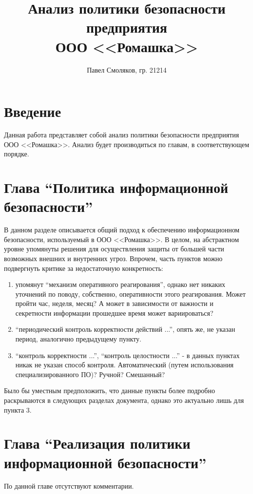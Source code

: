 \documentclass{article}
\title{Анализ политики безопасности предприятия\\ООО <<Ромашка>>}
\author{Павел Смоляков, гр. 21214}
\begin{document}
\maketitle

\section{Введение}
Данная работа представляет собой анализ политики безопасности предприятия ООО <<Ромашка>>. Анализ будет производиться по главам, в соответствующем порядке.

\section{Глава ``Политика информационной безопасности''}
В данном разделе описывается общий подход к обеспечению информационном безопасности, используемый в ООО <<Ромашка>>. В целом, на абстрактном уровне упомянуты решения для осуществления защиты от большей части возможных внешних и внутренних угроз. Впрочем, часть пунктов можно подвергнуть критике за недостаточную конкретность: 
\begin{enumerate}
    \item упомянут ``механизм оперативного реагирования'', однако нет никаких уточнений по поводу, собственно, оперативности этого реагирования. Может пройти час, неделя, месяц? А может в зависимости от важности и секретности информации прошедшее время может вариироваться?
    \item ``периодический контроль корректности действий ...'', опять же, не указан период, аналогично предыдущему пункту.
    \item ``контроль корректности ...'', ``контроль целостности ...'' - в данных пунктах никак не указан способ контроля. Автоматический (путем использования специализированного ПО)? Ручной? Смешанный?
\end{enumerate}

Было бы уместным предположить, что данные пункты более подробно раскрываются в следующих разделах документа, однако это актуально лишь для пункта 3.

\section{Глава ``Реализация политики информационной безопасности''}
По данной главе отсутствуют комментарии.
\end{document}
